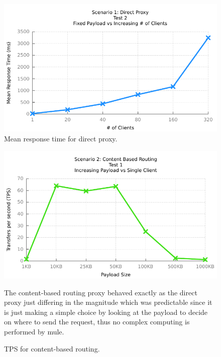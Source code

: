 \begin{figure}[H]
	\caption{Mean response time for direct proxy.}
	\centerline{\includegraphics{img/proxy_fp_iu_resp}}
	\label{fig:proxy-2-2}
\end{figure}


\begin{figure}[H]
	\caption{TPS for content-based routing.}
	\centerline{\includegraphics{img/mediation_fu_ip_tps}}
	\label{fig:mediation-1-1}
	The content-based routing proxy behaved exactly as the direct proxy just differing in the magnitude which was predictable since it is just making a simple choice by looking at the payload to decide on where to send the request, thus no complex computing is performed by mule.
\end{figure}

